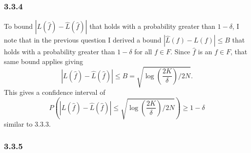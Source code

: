 \documentclass[12pt]{amsart}
\begin{document}
\subsubsection*{3.3.4}

To bound $|L(\hat{f}) - \hat{L}(\hat{f})|$ that holds with a probability greater than $1 - \delta$, I note that in the previous question I derived a bound $|\hat{L}(f) - L(f)| \leq B$ that holds with a probability greater than $1 - \delta$ for all $f \in F$.  Since $\hat{f}$ is an $f \in F$, that same bound applies giving 
\begin{equation}
|L(\hat{f}) - \hat{L}(\hat{f})| \leq B = \sqrt{\log(\frac{2K}{\delta})/2N}.
\end{equation}
This gives a confidence interval of 
\begin{equation}
P(|L(\hat{f}) - \hat{L}(\hat{f})| \leq \sqrt{\log(\frac{2K}{\delta})/2N}) \geq 1 - \delta
\end{equation}
similar to 3.3.3.

\subsubsection*{3.3.5}
\end{document}
